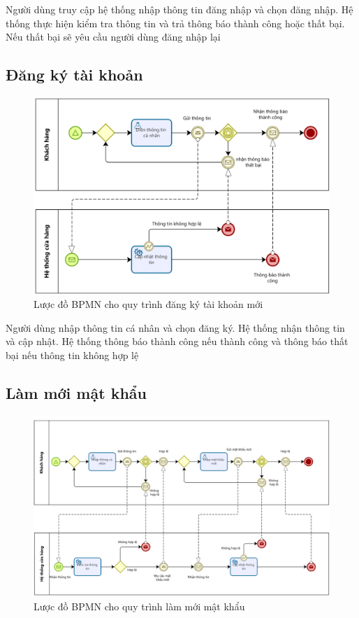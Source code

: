 Người dùng truy cập hệ thống nhập thông tin đăng nhập và chọn đăng nhập. Hệ thống thực hiện kiểm tra thông tin và trả thông báo thành công hoặc thất bại. Nếu thất bại sẽ yêu cầu người dùng đăng nhập lại

\subsection{Đăng ký tài khoản}
\begin{figure}[!htp]
	\centering
	\includegraphics[width=14cm]{img/BPMN/Hien/Customer_register.png}
	\newline
	\caption{Lược đồ BPMN cho quy trình đăng ký tài khoản mới}
\end{figure}

Người dùng nhập thông tin cá nhân và chọn đăng ký. Hệ thống nhận thông tin và cập nhật. Hệ thống thông báo thành công nếu thành công và thông báo thất bại nếu thông tin không hợp lệ


\subsection{Làm mới mật khẩu}
\begin{figure}[!htp]
	\centering
	\includegraphics[width=14cm]{img/BPMN/Hien/Customer_resetPassword.png}
	\newline
	\caption{Lược đồ BPMN cho quy trình làm mới mật khẩu}
\end{figure}

